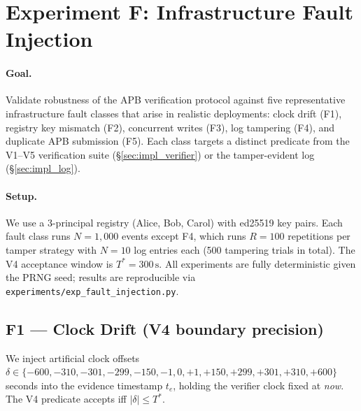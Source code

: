 \documentclass[11pt]{article}
\begin{document}
\section{Experiment F: Infrastructure Fault Injection}
\label{sec:exp_f}

\paragraph{Goal.}
Validate robustness of the APB verification protocol against five
representative infrastructure fault classes that arise in realistic
deployments: clock drift (F1), registry key mismatch (F2), concurrent
writes (F3), log tampering (F4), and duplicate APB submission (F5).
Each class targets a distinct predicate from the V1--V5 verification
suite (\S\ref{sec:impl_verifier}) or the tamper-evident log
(\S\ref{sec:impl_log}).

\paragraph{Setup.}
We use a 3-principal registry (Alice, Bob, Carol) with ed25519
key pairs.  Each fault class runs $N = 1{,}000$ events except
F4, which runs $R = 100$ repetitions per tamper strategy with
$N = 10$ log entries each (500 tampering trials in total).
The V4 acceptance window is $T^* = 300\,\mathrm{s}$.
All experiments are fully deterministic given the PRNG seed;
results are reproducible via \texttt{experiments/exp\_fault\_injection.py}.

\subsection*{F1 — Clock Drift (V4 boundary precision)}

We inject artificial clock offsets $\delta \in
\{-600, -310, -301, -299, -150, -1, 0, +1, +150, +299, +301, +310, +600\}$
seconds into the evidence timestamp $t_e$, holding the verifier
clock fixed at \emph{now}.  The V4 predicate accepts iff
$|\delta| \leq T^*$.
\end{document}
